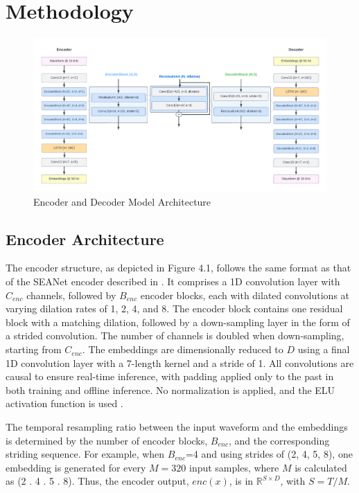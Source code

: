 \documentclass[12pt]{report}
\begin{document}
\chapter{Methodology}

\begin{figure}[H]
\includegraphics[width=1.07\textwidth]{Images/ED_4.pdf}
\caption{Encoder and Decoder Model Architecture}
\end{figure}

\section{Encoder Architecture} 
The encoder structure, as depicted in Figure 4.1, follows the same format as that of the SEANet encoder described in \cite{defossez2022high, tagliasacchi2020seanet}. It comprises a 1D convolution layer with $C_{enc}$ channels, followed by $B_{enc}$ encoder blocks, each with dilated convolutions at varying dilation rates of 1, 2, 4, and 8. The encoder block contains one residual block with a matching dilation, followed by a down-sampling layer in the form of a strided convolution. The number of channels is doubled when down-sampling, starting from $C_{enc}$. The embeddings are dimensionally reduced to $D$ using a final 1D convolution layer with a 7-length kernel and a stride of 1. All convolutions are causal to ensure real-time inference, with padding applied only to the past in both training and offline inference. No normalization is applied, and the ELU activation function is used \cite{clevert2015fast}.

The temporal resampling ratio between the input waveform and the embeddings is determined by the number of encoder blocks, $B_{enc}$, and the corresponding striding sequence. For example, when $B_{enc}$=4 and using strides of (2, 4, 5, 8), one embedding is generated for every $M=320$ input samples, where $M$ is calculated as (2 . 4 . 5 . 8). Thus, the encoder output, $enc(x)$, is in $\mathbb{R}^{S \times D}$, with $S = T / M$.
\end{document}
